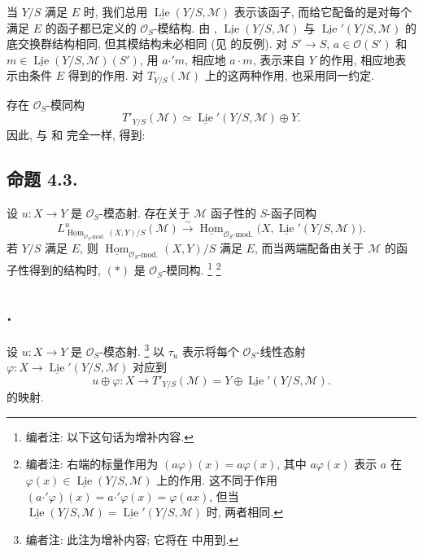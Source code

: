 当 \(Y/S\) 满足 \(E\) 时, 我们总用
\(\underline{\operatorname{Lie}}(Y/S,\mathcal M)\) 表示该函子,
而给它配备的是对每个满足 \(E\) 的函子都已定义的 \(\mathcal O_S\)-模结构.
由 ,
\(\underline{\operatorname{Lie}}(Y/S,\mathcal M)\) 与
\(\underline{\operatorname{Lie}}'(Y/S,\mathcal M)\) 的底交换群结构相同,
但其模结构未必相同 (见  的反例).
对 \(S'\to S\), \(a\in\mathcal O(S')\) 和
\(m\in\underline{\operatorname{Lie}}(Y/S,\mathcal M)(S')\),
用 \(a\mathbin{\cdot'}m\), 相应地 \(a\cdot m\),
表示来自 \(Y\) 的作用, 相应地表示由条件 \(E\) 得到的作用.
对 \(T_{Y/S}(\mathcal M)\) 上的这两种作用, 也采用同一约定.

存在 \(\mathcal O_S\)-模同构
\[
 T'_{Y/S}(\mathcal M)
 \simeq \underline{\operatorname{Lie}}'(Y/S,\mathcal M)\oplus Y.
\]
因此, 与 和
 完全一样, 得到:

\subsection*{命题 4.3.}
设 \(u:X\to Y\) 是 \(\mathcal O_S\)-模态射.
存在关于 \(\mathcal M\) 函子性的 \(S\)-函子同构
\begin{equation}
 L^u_{\underline{\operatorname{Hom}}_{\mathcal O_S\text{-mod.}}(X,Y)/S}
   (\mathcal M)
 \xrightarrow{\sim}
 \underline{\operatorname{Hom}}_{\mathcal O_S\text{-mod.}}
   \bigl(X,\underline{\operatorname{Lie}}'(Y/S,\mathcal M)\bigr).
 \tag{*}\label{sga3:ii:subsection:4-3:equation:hom-lie-isomorphism-star}
\end{equation}
若 \(Y/S\) 满足 \(E\), 则
\(\underline{\operatorname{Hom}}_{\mathcal O_S\text{-mod.}}(X,Y)/S\) 满足 \(E\),
而当两端配备由关于 \(\mathcal M\) 的函子性得到的结构时,
\((*)\) 是 \(\mathcal O_S\)-模同构.
\footnote{编者注: 以下这句话为增补内容.}
\footnote{编者注: 右端的标量作用为 \((a\varphi)(x)=a\varphi(x)\),
其中 \(a\varphi(x)\) 表示 \(a\) 在
\(\varphi(x)\in
\underline{\operatorname{Lie}}(Y/S,\mathcal M)\) 上的作用.
这不同于作用 \((a\mathbin{\cdot'}\varphi)(x)
=a\mathbin{\cdot'}\varphi(x)=\varphi(ax)\),
但当 \(\underline{\operatorname{Lie}}(Y/S,\mathcal M)
=\underline{\operatorname{Lie}}'(Y/S,\mathcal M)\) 时, 两者相同.}

\subsection*{.}
设 \(u:X\to Y\) 是 \(\mathcal O_S\)-模态射.
\footnote{编者注: 此注为增补内容; 它将在  中用到.}
以 \(\tau_u\) 表示将每个 \(\mathcal O_S\)-线性态射
\(\varphi:X\to\underline{\operatorname{Lie}}'(Y/S,\mathcal M)\) 对应到
\[
 u\oplus\varphi:X\longrightarrow
 T'_{Y/S}(\mathcal M)
 =Y\oplus\underline{\operatorname{Lie}}'(Y/S,\mathcal M).
 \]
的映射.

